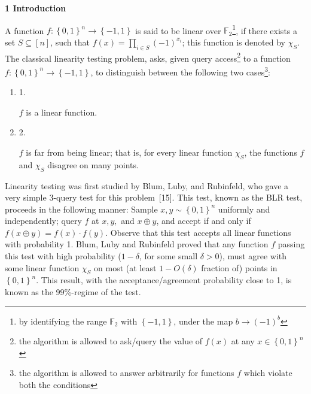 

\par\medskip\noindent\textbf{
1 Introduction}\par




A function $f:\left\{0,1\right\}^{n}\to\left\{-1,1\right\}$ is said to be linear over $\mathbb{F}_{2}$\footnote{by identifying the range $\mathbb{F}_{2}$ with $\left\{-1,1\right\}$, under the map $b\to(-1)^{b}$}, if there exists a set $S\subseteq[n]$, such that $f(x)=\prod_{i\in S}\left(-1\right)^{x_{i}}$; this function is denoted by $\chi_{S}$.
The classical linearity testing problem, asks, given query access\footnote{the algorithm is allowed to ask/query the value of $f(x)$ at any $x\in\left\{0,1\right\}^{n}$} to a function $f:\left\{0,1\right\}^{n}\to\left\{-1,1\right\}$, to distinguish between the following two cases\footnote{the algorithm is allowed to answer arbitrarily for functions $f$ which violate both the conditions}:\par


\begin{enumerate}


\item[] 
1. 


$f$ is a linear function.\par





\item[] 
2. 


$f$ is far from being linear; that is, for every linear function $\chi_{S}$, the functions $f$ and $\chi_{S}$ disagree on many points.\par





\end{enumerate}




Linearity testing was first studied by Blum, Luby, and Rubinfeld, who gave a very simple 3-query test for this problem [15].
This test, known as the BLR test, proceeds in the following manner: Sample $x,y\sim\left\{0,1\right\}^{n}$ uniformly and independently; query $f$ at $x,y,$ and $x\oplus y$, and accept if and only if $f(x\oplus y)=f(x)\cdot f(y)$.
Observe that this test accepts all linear functions with probability 1.
Blum, Luby and Rubinfeld proved that any function $f$ passing this test with high probability ($1-\delta$, for some small $\delta>0$), must agree with some linear function $\chi_{S}$ on most (at least $1-O(\delta)$ fraction of) points in $\left\{0,1\right\}^{n}$.
This result, with the acceptance/agreement probability close to 1, is known as the 99\%-regime of the test.\par




